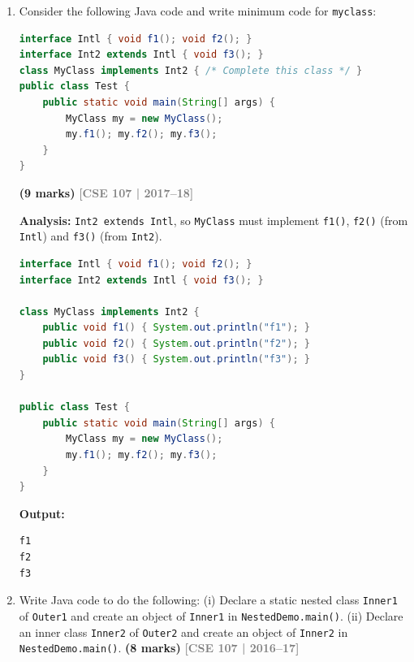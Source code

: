\documentclass[12pt,a3paper]{article}
\newcommand{\yr}[1]{\hfill\textcolor{gray}{\small\textbf{[#1]}}}
\newcommand{\mk}[1]{\textcolor{orange!70!black}{\small\textbf{(#1 marks)}}}
\begin{document}
\begin{enumerate}
\begin{tcolorbox}[enhanced,breakable,ansbox,
  colback=cD!4,colframe=cD,boxrule=0.8pt,arc=5pt,
  title={\textbf{Answer --- Abstract Class Restrictions \& Fix}},
  fonttitle=\bfseries\color{white},colbacktitle=cD]
\end{tcolorbox}

\item Consider the following Java code and write minimum code for \texttt{myclass}:
\begin{lstlisting}[language=Java]
interface Intl { void f1(); void f2(); }
interface Int2 extends Intl { void f3(); }
class MyClass implements Int2 { /* Complete this class */ }
public class Test {
    public static void main(String[] args) {
        MyClass my = new MyClass();
        my.f1(); my.f2(); my.f3();
    }
}
\end{lstlisting}
\mk{9}
\yr{CSE 107 | 2017--18}

\begin{tcolorbox}[enhanced,breakable,ansbox,
  colback=cD!4,colframe=cD,boxrule=0.8pt,arc=5pt,
  title={\textbf{Answer --- Minimum Code for \texttt{MyClass}}},
  fonttitle=\bfseries\color{white},colbacktitle=cD]

\textbf{Analysis:} \texttt{Int2 extends Intl}, so \texttt{MyClass}
must implement \texttt{f1()}, \texttt{f2()} (from \texttt{Intl}) and
\texttt{f3()} (from \texttt{Int2}).

\begin{lstlisting}[language=Java]
interface Intl { void f1(); void f2(); }
interface Int2 extends Intl { void f3(); }

class MyClass implements Int2 {
    public void f1() { System.out.println("f1"); }
    public void f2() { System.out.println("f2"); }
    public void f3() { System.out.println("f3"); }
}

public class Test {
    public static void main(String[] args) {
        MyClass my = new MyClass();
        my.f1(); my.f2(); my.f3();
    }
}
\end{lstlisting}

\textbf{Output:}
\begin{lstlisting}
f1
f2
f3
\end{lstlisting}

\end{tcolorbox}

\item Write Java code to do the following: (i) Declare a static nested class \texttt{Inner1} of \texttt{Outer1} and create an object of \texttt{Inner1} in \texttt{NestedDemo.main()}. (ii) Declare an inner class \texttt{Inner2} of \texttt{Outer2} and create an object of \texttt{Inner2} in \texttt{NestedDemo.main()}. \mk{8}
\yr{CSE 107 | 2016--17}


\end{enumerate}
\end{document}
